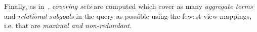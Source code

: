 \begin{example}


\end{example}


\vspace*{-0.1cm}
Finally, as in~\cite{wu2018data}, {\em covering sets} are computed %
which cover as many {\em aggregate terms} and {\em relational subgoals} in the query as possible using the fewest view mappings, i.e. that are \textit{maximal and non-redundant}.

